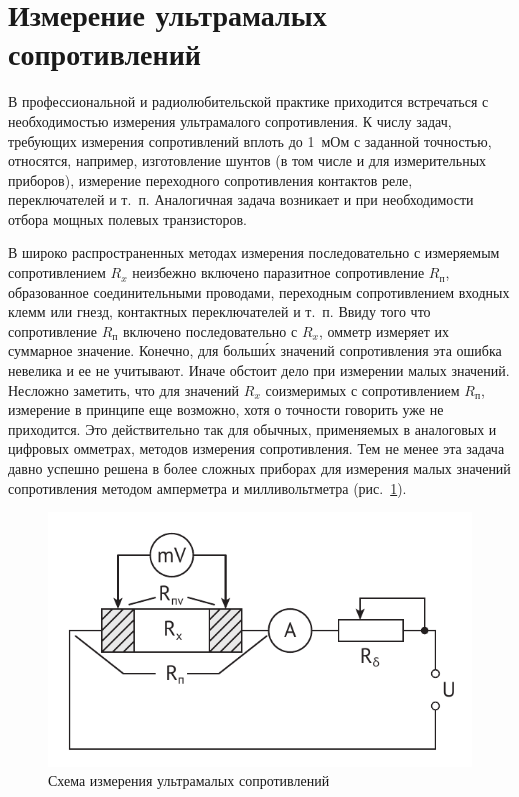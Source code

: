 \documentclass[pscyr,titlepage]{hedreport}
\newcommand{\Pic}[1]{\ref{pic#1}}
\newcommand{\pic}[1]{рис.~\Pic{#1}}
\begin{document}
  \section{Измерение ультрамалых сопротивлений}

  В профессиональной и радиолюбительской практике приходится встречаться с
  необходимостью измерения ультрамалого сопротивления. К числу задач, требующих
  измерения сопротивлений вплоть до 1~мОм с заданной точностью, относятся,
  например, изготовление шунтов (в том числе и для измерительных приборов),
  измерение переходного сопротивления контактов реле, переключателей и т.~п.
  Аналогичная задача возникает и при необходимости отбора мощных полевых
  транзисторов.
  
  В широко распространенных методах измерения последовательно с измеряемым
  сопротивлением \( R_x \) неизбежно включено паразитное сопротивление
  \( R_\text{п} \), образованное соединительными проводами, переходным
  сопротивлением входных клемм или гнезд, контактных переключателей и т.~п.
  Ввиду того что сопротивление \( R_\text{п} \) включено последовательно с
  \( R_x \), омметр измеряет их суммарное значение. Конечно, для больш\'{и}х
  значений сопротивления эта ошибка невелика и ее не учитывают. Иначе обстоит
  дело при измерении малых значений. Несложно заметить, что для значений
  \( R_x \) соизмеримых с сопротивлением \( R_\text{п} \), измерение в принципе
  еще возможно, хотя о точности говорить уже не приходится. Это действительно
  так для обычных, применяемых в аналоговых и цифровых омметрах, методов
  измерения сопротивления. Тем не менее эта задача давно успешно решена в более
  сложных приборах для измерения малых значений сопротивления методом амперметра
  и милливольтметра (\pic{ultra}).
  
  \begin{figure}[!t]
    \center
    \includegraphics[width=.6\textwidth]{ultra}
    \caption{Схема измерения ультрамалых сопротивлений}
    \label{picultra}
  \end{figure}
 
\end{document}
